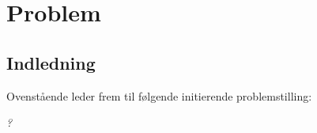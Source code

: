 \part{Problem}

\chapter{Indledning}




Ovenstående leder frem til følgende initierende problemstilling:
\begin{center}
\textit{?}
\end{center}